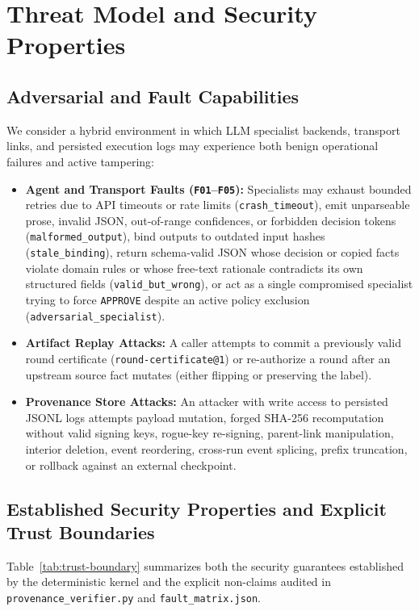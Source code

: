 \documentclass[11pt,a4paper]{article}
\begin{document}
\section{Threat Model and Security Properties}

\subsection{Adversarial and Fault Capabilities}
We consider a hybrid environment in which LLM specialist backends, transport links, and persisted execution logs may experience both benign operational failures and active tampering:
\begin{itemize}[leftmargin=*,itemsep=2pt]
    \item \textbf{Agent and Transport Faults (\texttt{F01}--\texttt{F05}):} Specialists may exhaust bounded retries due to API timeouts or rate limits (\texttt{crash\_timeout}), emit unparseable prose, invalid JSON, out-of-range confidences, or forbidden decision tokens (\texttt{malformed\_output}), bind outputs to outdated input hashes (\texttt{stale\_binding}), return schema-valid JSON whose decision or copied facts violate domain rules or whose free-text rationale contradicts its own structured fields (\texttt{valid\_but\_wrong}), or act as a single compromised specialist trying to force \texttt{APPROVE} despite an active policy exclusion (\texttt{adversarial\_specialist}).
    \item \textbf{Artifact Replay Attacks:} A caller attempts to commit a previously valid round certificate (\texttt{round-certificate@1}) or re-authorize a round after an upstream source fact mutates (either flipping or preserving the label).
    \item \textbf{Provenance Store Attacks:} An attacker with write access to persisted JSONL logs attempts payload mutation, forged SHA-256 recomputation without valid signing keys, rogue-key re-signing, parent-link manipulation, interior deletion, event reordering, cross-run event splicing, prefix truncation, or rollback against an external checkpoint.
\end{itemize}

\subsection{Established Security Properties and Explicit Trust Boundaries}
Table~\ref{tab:trust-boundary} summarizes both the security guarantees established by the deterministic kernel and the explicit non-claims audited in \texttt{provenance\_verifier.py} and \texttt{fault\_matrix.json}.
\end{document}
